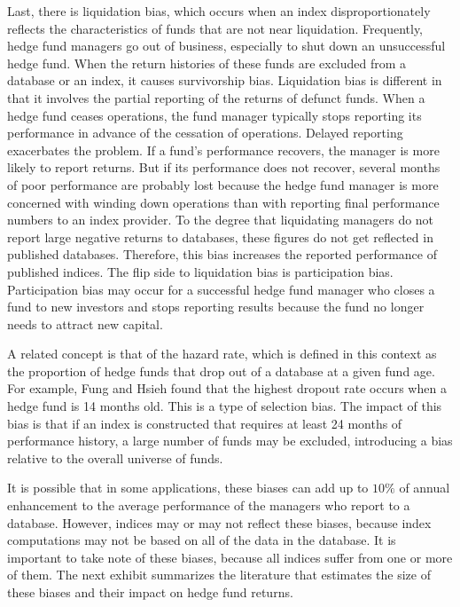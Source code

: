 \documentclass[11pt]{article}
\begin{document}
Last, there is liquidation bias, which occurs when an index disproportionately reflects the characteristics of funds that are not near liquidation. Frequently, hedge fund managers go out of business, especially to shut down an unsuccessful hedge fund. When the return histories of these funds are excluded from a database or an index, it causes survivorship bias. Liquidation bias is different in that it involves the partial reporting of the returns of defunct funds. When a hedge fund ceases operations, the fund manager typically stops reporting its performance in advance of the cessation of operations. Delayed reporting exacerbates the problem. If a fund's performance recovers, the manager is more likely to report returns. But if its performance does not recover, several months of poor performance are probably lost because the hedge fund manager is more concerned with winding down operations than with reporting final performance numbers to an index provider. To the degree that liquidating managers do not report large negative returns to databases, these figures do not get reflected in published databases. Therefore, this bias increases the reported performance of published indices. The flip side to liquidation bias is participation bias. Participation bias may occur for a successful hedge fund manager who closes a fund to new investors and stops reporting results because the fund no longer needs to attract new capital.

A related concept is that of the hazard rate, which is defined in this context as the proportion of hedge funds that drop out of a database at a given fund age. For example, Fung and Hsieh found that the highest dropout rate occurs when a hedge fund is 14 months old. This is a type of selection bias. The impact of this bias is that if an index is constructed that requires at least 24 months of performance history, a large number of funds may be excluded, introducing a bias relative to the overall universe of funds.

It is possible that in some applications, these biases can add up to $10 \%$ of annual enhancement to the average performance of the managers who report to a database. However, indices may or may not reflect these biases, because index computations may not be based on all of the data in the database. It is important to take note of these biases, because all indices suffer from one or more of them. The next exhibit summarizes the literature that estimates the size of these biases and their impact on hedge fund returns.
\end{document}
